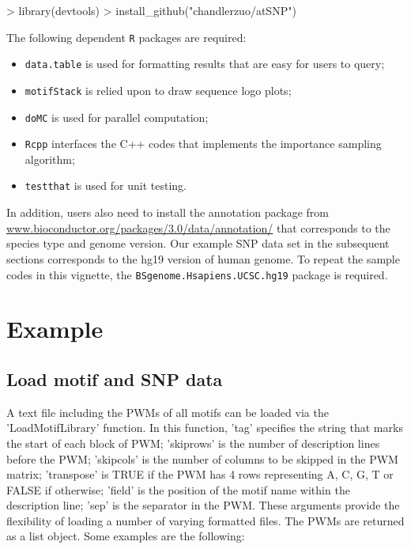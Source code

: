\documentclass[a4paper,10pt]{article}
\begin{document}
\begin{Schunk}
\begin{Sinput}
> library(devtools)
> install_github("chandlerzuo/atSNP")
\end{Sinput}
\end{Schunk}

The following dependent \texttt{R} packages are required:

\begin{itemize}
\item \texttt{data.table} is used for formatting results that are easy for users to query;
\item \texttt{motifStack} is relied upon to draw sequence logo plots;
\item \texttt{doMC} is used for parallel computation;
\item \texttt{Rcpp} interfaces the C++ codes that implements the importance sampling algorithm;
\item \texttt{testthat} is used for unit testing.
\end{itemize}
  
In addition, users also need to install the annotation package from \url{www.bioconductor.org/packages/3.0/data/annotation/} that corresponds to the species type and genome version. Our example SNP data set in the subsequent sections corresponds to the hg19 version of human genome. To repeat the sample codes in this vignette, the \texttt{BSgenome.Hsapiens.UCSC.hg19} package is required.

\section{Example}

\subsection{Load motif and SNP data}

A text file including the PWMs of all motifs can be loaded via the 'LoadMotifLibrary' function. In this function, 'tag' specifies the string that marks the start of each block of PWM; 'skiprows' is the number of description lines before the PWM; 'skipcols' is the number of columns to be skipped in the PWM matrix; 'transpose' is TRUE if the PWM has 4 rows representing A, C, G, T or FALSE if otherwise; 'field' is the position of the motif name within the description line; 'sep' is the separator in the PWM. These arguments provide the flexibility of loading a number of varying formatted files. The PWMs are returned as a list object. Some examples are the following:
\end{document}
